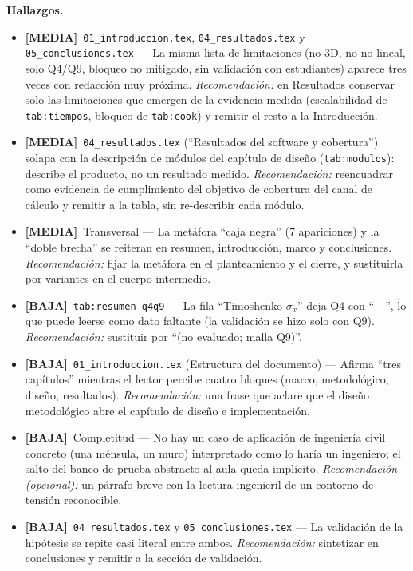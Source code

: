 \documentclass[11pt,a4paper]{article}
\newcommand{\sevmedia}{\textcolor{cMedia}{\textbf{[MEDIA]}}}
\newcommand{\sevbaja}{\textcolor{cBaja}{\textbf{[BAJA]}}}
\newcommand{\fileref}[1]{\texttt{\small #1}}
\begin{document}
\textbf{Hallazgos.}
\begin{itemize}
  \item \sevmedia\ \fileref{01\_introduccion.tex}, \fileref{04\_resultados.tex} y \fileref{05\_conclusiones.tex} — La misma lista de limitaciones (no 3D, no no-lineal, solo Q4/Q9, bloqueo no mitigado, sin validación con estudiantes) aparece tres veces con redacción muy próxima. \textit{Recomendación:} en Resultados conservar solo las limitaciones que emergen de la evidencia medida (escalabilidad de \fileref{tab:tiempos}, bloqueo de \fileref{tab:cook}) y remitir el resto a la Introducción.
  \item \sevmedia\ \fileref{04\_resultados.tex} (``Resultados del software y cobertura'') solapa con la descripción de módulos del capítulo de diseño (\fileref{tab:modulos}): describe el producto, no un resultado medido. \textit{Recomendación:} reencuadrar como evidencia de cumplimiento del objetivo de cobertura del canal de cálculo y remitir a la tabla, sin re-describir cada módulo.
  \item \sevmedia\ Transversal — La metáfora ``caja negra'' (7 apariciones) y la ``doble brecha'' se reiteran en resumen, introducción, marco y conclusiones. \textit{Recomendación:} fijar la metáfora en el planteamiento y el cierre, y sustituirla por variantes en el cuerpo intermedio.
  \item \sevbaja\ \fileref{tab:resumen-q4q9} — La fila ``Timoshenko $\sigma_x$'' deja Q4 con ``---'', lo que puede leerse como dato faltante (la validación se hizo solo con Q9). \textit{Recomendación:} sustituir por ``(no evaluado; malla Q9)''.
  \item \sevbaja\ \fileref{01\_introduccion.tex} (Estructura del documento) — Afirma ``tres capítulos'' mientras el lector percibe cuatro bloques (marco, metodológico, diseño, resultados). \textit{Recomendación:} una frase que aclare que el diseño metodológico abre el capítulo de diseño e implementación.
  \item \sevbaja\ Completitud — No hay un caso de aplicación de ingeniería civil concreto (una ménsula, un muro) interpretado como lo haría un ingeniero; el salto del banco de prueba abstracto al aula queda implícito. \textit{Recomendación (opcional):} un párrafo breve con la lectura ingenieril de un contorno de tensión reconocible.
  \item \sevbaja\ \fileref{04\_resultados.tex} y \fileref{05\_conclusiones.tex} — La validación de la hipótesis se repite casi literal entre ambos. \textit{Recomendación:} sintetizar en conclusiones y remitir a la sección de validación.
\end{itemize}
\end{document}
